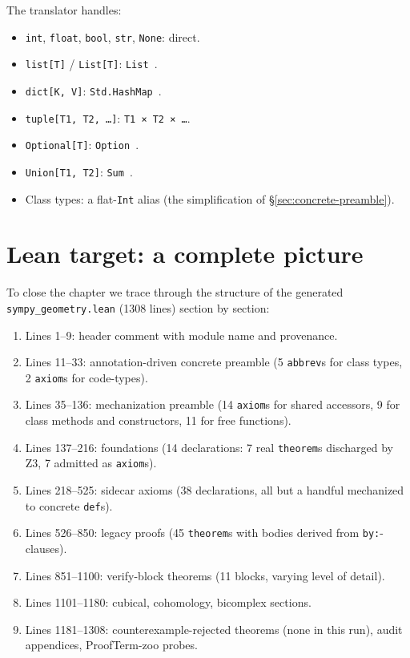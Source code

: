 The translator handles:
\begin{itemize}[leftmargin=1.7em]
  \item \texttt{int}, \texttt{float}, \texttt{bool}, \texttt{str},
    \texttt{None}: direct.
  \item \texttt{list[T]} / \texttt{List[T]}: \texttt{List }.
  \item \texttt{dict[K, V]}: \texttt{Std.HashMap  }.
  \item \texttt{tuple[T1, T2, \dots]}: \texttt{T1 × T2 × \dots}.
  \item \texttt{Optional[T]}: \texttt{Option }.
  \item \texttt{Union[T1, T2]}: \texttt{Sum  }.
  \item Class types: a flat-\texttt{Int} alias (the simplification
    of \S\ref{sec:concrete-preamble}).
\end{itemize}

\section{Lean target: a complete picture}
\label{sec:lean-complete}

To close the chapter we trace through the structure of the
generated \texttt{sympy\_geometry.lean} (1308 lines) section by
section:

\begin{enumerate}[leftmargin=1.7em]
  \item Lines 1--9: header comment with module name and
    provenance.
  \item Lines 11--33: annotation-driven concrete preamble
    (5 \texttt{abbrev}s for class types, 2 \texttt{axiom}s for
    code-types).
  \item Lines 35--136: mechanization preamble
    (14 \texttt{axiom}s for shared accessors, 9 for class methods
    and constructors, 11 for free functions).
  \item Lines 137--216: foundations (14 declarations: 7 real
    \texttt{theorem}s discharged by Z3, 7 admitted as
    \texttt{axiom}s).
  \item Lines 218--525: sidecar axioms (38 declarations, all but a
    handful mechanized to concrete \texttt{def}s).
  \item Lines 526--850: legacy proofs (45 \texttt{theorem}s with
    bodies derived from \texttt{by:}-clauses).
  \item Lines 851--1100: verify-block theorems (11 blocks, varying
    level of detail).
  \item Lines 1101--1180: cubical, cohomology, bicomplex sections.
  \item Lines 1181--1308: counterexample-rejected theorems (none
    in this run), audit appendices, ProofTerm-zoo probes.
\end{enumerate}

